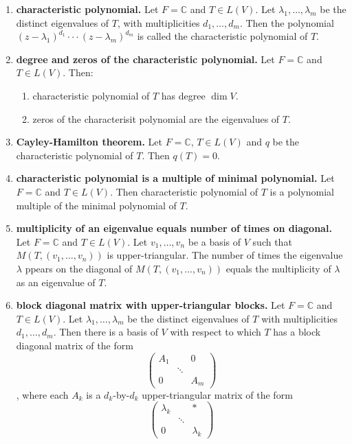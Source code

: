 \begin{enumerate}
	\item \textbf{characteristic polynomial. } Let $F = \mathbb{C}$ and $T \in L(V)$. Let $\lambda_1,\dots,\lambda_m$ be the distinct eigenvalues of $T$, with multiplicities $d_1,\dots,d_m$. Then the polynomial $(z - \lambda_1)^{d_1} \cdot \cdot \cdot (z - \lambda_m)^{d_m}$ is called the characteristic polynomial of $T$. 
	\item \textbf{degree and zeros of the characteristic polynomial. } Let $F = \mathbb{C}$ and $T \in L(V)$. Then: 
	\begin{enumerate}
		\item characteristic polynomial of $T$ has degree $\dim V$. 
		\item zeros of the characterisit polynomial are the eigenvalues of $T$. 
	\end{enumerate}
	\item \textbf{Cayley-Hamilton theorem. } Let $F = \mathbb{C}$, $T \in L(V)$ and $q$ be the characteristic polynomial of $T$. Then $q(T) = 0$. 
	\item \textbf{characteristic polynomial is a multiple of minimal polynomial. } Let $F = \mathbb{C}$ and $T \in L(V)$. Then characteristic polynomial of $T$ is a polynomial multiple of the minimal polynomial of $T$. 
	\item \textbf{multiplicity of an eigenvalue equals number of times on diagonal. } Let $F = \mathbb{C}$ and $T \in L(V)$. Let $v_1,\dots,v_n$ be a basis of $V$ such that $M(T,(v_1,\dots,v_n))$ is upper-triangular. The number of times the eigenvalue $\lambda$ ppears on the diagonal of $M(T,(v_1,\dots,v_n))$ equals the multiplicity of $\lambda$ as an eigenvalue of $T$. 
	\item \textbf{block diagonal matrix with upper-triangular blocks. } Let $F = \mathbb{C}$ and $T \in L(V)$. Let $\lambda_1,\dots,\lambda_m$ be the distinct eigenvalues of $T$ with multiplicities $d_1,\dots,d_m$. Then there is a basis of $V$ with respect to which $T$ has a block diagonal matrix of the form 
	$$
	\begin{pmatrix}
	A_1 & & 0 \\
	 & \ddots &  \\
	0 & & A_m
	\end{pmatrix}
	$$, where each $A_k$ is a $d_k$-by-$d_k$ upper-triangular matrix of the form 
	$$
	\begin{pmatrix}
	\lambda_k & & * \\
	 & \ddots &  \\
	0 & & \lambda_k
	\end{pmatrix}
$$
\end{enumerate}
